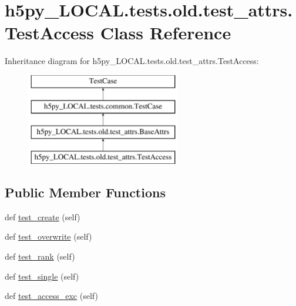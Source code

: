 \hypertarget{classh5py__LOCAL_1_1tests_1_1old_1_1test__attrs_1_1TestAccess}{}\section{h5py\+\_\+\+L\+O\+C\+A\+L.\+tests.\+old.\+test\+\_\+attrs.\+Test\+Access Class Reference}
\label{classh5py__LOCAL_1_1tests_1_1old_1_1test__attrs_1_1TestAccess}
Inheritance diagram for h5py\+\_\+\+L\+O\+C\+A\+L.\+tests.\+old.\+test\+\_\+attrs.\+Test\+Access\+:\begin{figure}[H]
\begin{center}
\leavevmode
\includegraphics[height=4.000000cm]{classh5py__LOCAL_1_1tests_1_1old_1_1test__attrs_1_1TestAccess}
\end{center}
\end{figure}
\subsection*{Public Member Functions}
\begin{DoxyCompactItemize}
\item 
def \hyperlink{classh5py__LOCAL_1_1tests_1_1old_1_1test__attrs_1_1TestAccess_ad7b059fa6810c805f3052f31b5650890}{test\+\_\+create} (self)
\item 
def \hyperlink{classh5py__LOCAL_1_1tests_1_1old_1_1test__attrs_1_1TestAccess_a13e304589822416e38f0f8b97ec0d540}{test\+\_\+overwrite} (self)
\item 
def \hyperlink{classh5py__LOCAL_1_1tests_1_1old_1_1test__attrs_1_1TestAccess_a4f756964716d9d4ce80052c0cfc15707}{test\+\_\+rank} (self)
\item 
def \hyperlink{classh5py__LOCAL_1_1tests_1_1old_1_1test__attrs_1_1TestAccess_a6bf3df5f3ee4cf13edd758a300caad5b}{test\+\_\+single} (self)
\item 
def \hyperlink{classh5py__LOCAL_1_1tests_1_1old_1_1test__attrs_1_1TestAccess_a20e0387ac8cf7e8be1ca809f7f6acd66}{test\+\_\+access\+\_\+exc} (self)
\end{DoxyCompactItemize}
